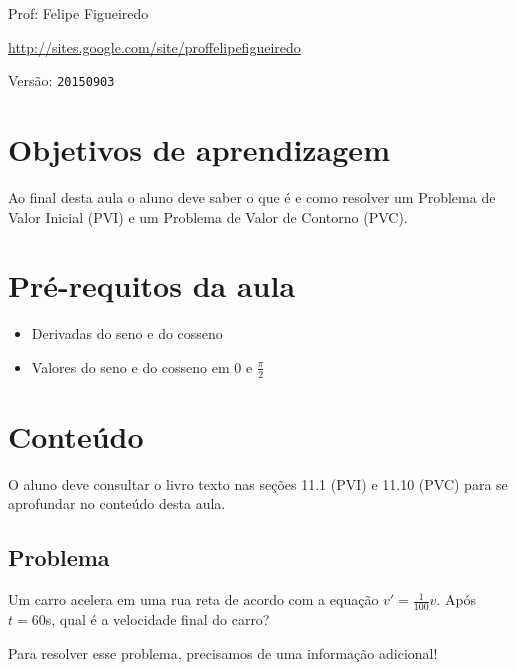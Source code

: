 \documentclass[a4paper]{article}
\begin{document}
\parbox[c]{.825\textwidth}{\raggedright%
{Prof: Felipe Figueiredo\par}
{\url{http://sites.google.com/site/proffelipefigueiredo}\par}
}

Versão: \verb|20150903|



\section{Objetivos de aprendizagem}

Ao final desta aula o aluno deve saber o que é e como resolver um
Problema de Valor Inicial (PVI) e um Problema de Valor de Contorno
(PVC).


\section{Pré-requitos da aula}

\begin{itemize}
\item Derivadas do seno e do cosseno
\item Valores do seno e do cosseno em $0$ e $\frac{\pi}{2}$
\end{itemize}

\section{Conteúdo}

O aluno deve consultar o livro texto nas seções 11.1 (PVI) e 11.10 (PVC)
para se aprofundar no conteúdo desta aula.

\subsection{Problema}

Um carro acelera em uma rua reta de acordo com a equação
$v'=\frac{1}{100}v$. Após $t=60$s, qual é a velocidade final do carro?

Para resolver esse problema, precisamos de uma informação adicional!
\end{document}
